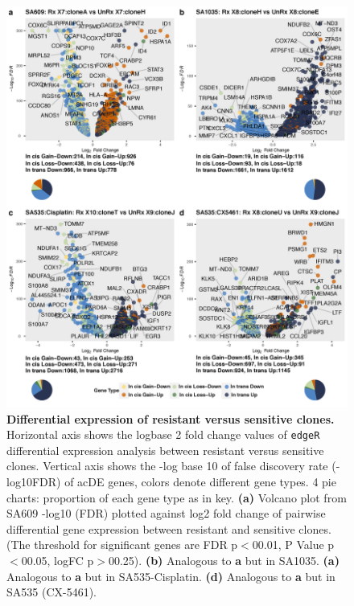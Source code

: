 \begin{figure}
\centering
  \includegraphics[width=\textwidth]{Figures/chap5/Volcanoes4plots.png}
\caption[DE of resistant and sensitive clonealign defined clones]
	{\small
	\textbf{Differential expression of resistant versus sensitive clones.}
	Horizontal axis shows the logbase 2 fold change values of \texttt{edgeR} differential expression analysis between resistant versus sensitive clones. Vertical axis shows the -log base 10 of false discovery rate (-log10FDR) of ac{DE} genes, colors denote different gene types. 4 pie charts:  proportion of each gene type as in key.
	\textbf{(a)} Volcano plot from SA609 -log10 (FDR) plotted against log2 fold change of pairwise differential gene expression between resistant and sensitive clones. (The threshold for significant genes are FDR p$<$00.01, P Value p$<$00.05, logFC p$>$00.25). \textbf{(b)} Analogous to \textbf{a} but in SA1035. \textbf{(a)} Analogous to \textbf{a} but in SA535-Cisplatin. \textbf{(d)} Analogous to \textbf{a} but in SA535 (CX-5461).
	   }
	\label{fig:Volcanoes4plots}
 \end{figure}


